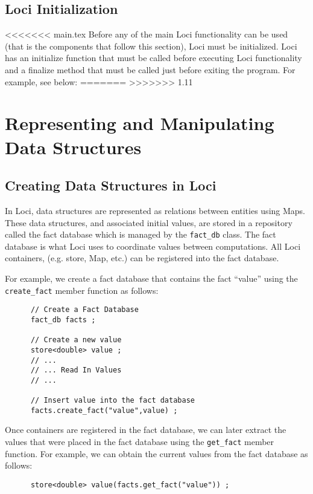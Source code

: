 \documentclass[10pt,epsf]{book}
\begin{document}


\section{Loci Initialization}

<<<<<<< main.tex
Before any of the main Loci functionality can be used (that is the
components that follow this section), Loci must be initialized.  Loci
has an initialize function that must be called before executing Loci
functionality and a finalize method that must be called just before
exiting the program.  For example, see below:
=======
>>>>>>> 1.11


\chapter{Representing and Manipulating Data Structures}
\section{Creating Data Structures in Loci}

In Loci, data structures are represented as relations between entities
using Maps.  These data structures, and associated initial values, are
stored in a repository called the fact database which is managed by
the {\tt fact\_db} class.  The fact database is what Loci uses to
coordinate values between computations.  All Loci containers, (e.g.
store, Map, etc.) can be registered into the fact database.

For example, we create a fact database that contains the fact ``value'' using the {\tt create\_fact} member function as follows:
\begin{verbatim}
      // Create a Fact Database
      fact_db facts ;

      // Create a new value
      store<double> value ;
      // ...
      // ... Read In Values
      // ...
   
      // Insert value into the fact database
      facts.create_fact("value",value) ;
\end{verbatim}

Once containers are registered in the fact database, we can later
extract the values that were placed in the fact database using the 
{\tt get\_fact} member function.  For example, we can obtain the
current values from the fact database as follows:
\begin{verbatim}
      store<double> value(facts.get_fact("value")) ;
\end{verbatim}
\end{document}
